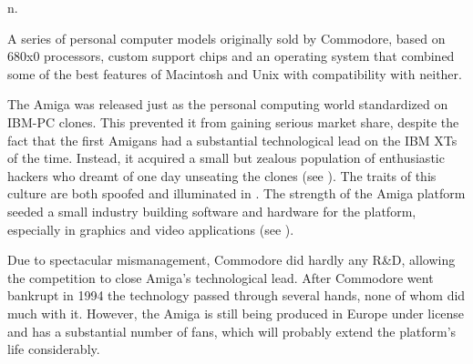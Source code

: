  n.

A series of personal computer models originally sold by Commodore, based on 680x0 processors, custom support chips and an operating system
that combined some of the best features of Macintosh and Unix with compatibility with neither.

The Amiga was released just as the personal computing world standardized on IBM-PC clones. This prevented it from gaining serious market
share, despite the fact that the first Amigans had a substantial technological lead on the IBM XTs of the time. Instead, it acquired a small
but zealous population of enthusiastic hackers who dreamt of one day unseating the clones (see ). The
traits of this culture are both spoofed and illuminated in . The strength of the Amiga platform seeded a
small industry building software and hardware for the platform, especially in graphics and video applications (see ).

Due to spectacular mismanagement, Commodore did hardly any R\&D, allowing the competition to close Amiga's technological lead. After
Commodore went bankrupt in 1994 the technology passed through several hands, none of whom did much with it. However, the Amiga is still
being produced in Europe under license and has a substantial number of fans, which will probably extend the platform's life considerably.

